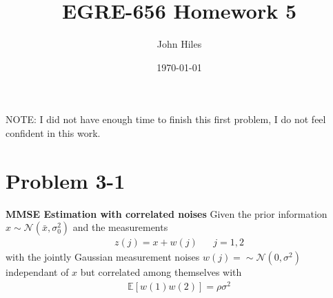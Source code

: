 \documentclass{article}
\title{EGRE-656 Homework 5}
\author{John Hiles}
\date\today
\begin{document}
\maketitle %

NOTE: I did not have enough time to finish this first problem, I do not feel confident in this work.

\section*{Problem 3-1}
\textbf{MMSE Estimation with correlated noises}
Given the prior information $x \sim \mathcal{N}(\bar{x},\sigma^2_0)$ and the measurements 
\begin{align*}
z(j) = x + w(j) && j=1,2
\end{align*}
with the jointly Gaussian measurement noises $w(j)=\sim \mathcal{N}(0,\sigma^2)$ independant of $x$ but correlated among themselves with
\begin{align*}
\mathbb{E}[w(1)w(2)] = \rho \sigma^2
\end{align*}
\end{document}
